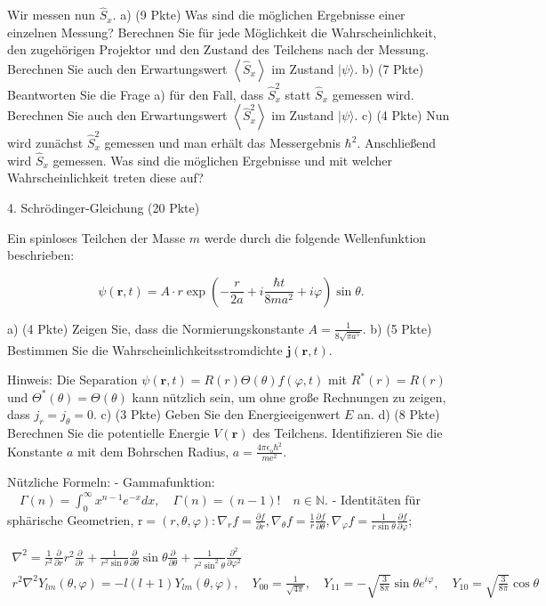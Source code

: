 \documentclass[11pt,a4paper]{article}
\begin{document}
Wir messen nun $\hat{S}_x$.
a) (9 Pkte) Was sind die möglichen Ergebnisse einer einzelnen Messung? Berechnen Sie für jede Möglichkeit die Wahrscheinlichkeit, den zugehörigen Projektor und den Zustand des Teilchens nach der Messung. Berechnen Sie auch den Erwartungswert $\left\langle\hat{S}_x\right\rangle$ im Zustand $|\psi\rangle$.
b) (7 Pkte) Beantworten Sie die Frage a) für den Fall, dass $\hat{S}_x^2$ statt $\hat{S}_x$ gemessen wird. Berechnen Sie auch den Erwartungswert $\left\langle\hat{S}_x^2\right\rangle$ im Zustand $|\psi\rangle$.
c) (4 Pkte) Nun wird zunächst $\hat{S}_x^2$ gemessen und man erhält das Messergebnis $\hbar^2$. Anschließend wird $\hat{S}_x$ gemessen. Was sind die möglichen Ergebnisse und mit welcher Wahrscheinlichkeit treten diese auf?



4. Schrödinger-Gleichung (20 Pkte)

Ein spinloses Teilchen der Masse $m$ werde durch die folgende Wellenfunktion beschrieben:

$$
\psi(\mathbf{r}, t)=A \cdot r \exp \left(-\frac{r}{2 a}+i \frac{\hbar t}{8 m a^2}+i \varphi\right) \sin \theta .
$$

a) (4 Pkte) Zeigen Sie, dass die Normierungskonstante $A=\frac{1}{8 \sqrt{\pi a^5}}$.
b) (5 Pkte) Bestimmen Sie die Wahrscheinlichkeitsstromdichte $\mathbf{j}(\mathbf{r}, t)$.

Hinweis: Die Separation $\psi(\mathbf{r}, t)=R(r) \Theta(\theta) f(\varphi, t)$ mit $R^*(r)=R(r)$ und $\Theta^*(\theta)=\Theta(\theta)$ kann nützlich sein, um ohne große Rechnungen zu zeigen, dass $j_r=j_\theta=0$.
c) (3 Pkte) Geben Sie den Energieeigenwert $E$ an.
d) (8 Pkte) Berechnen Sie die potentielle Energie $V(\mathbf{r})$ des Teilchens. Identifizieren Sie die Konstante $a$ mit dem Bohrschen Radius, $a=\frac{4 \pi \epsilon_{\mathrm{o}} \hbar^2}{m \mathrm{e}^2}$.

Nützliche Formeln:
- Gammafunktion: $\quad \Gamma(n)=\int_0^{\infty} x^{n-1} e^{-x} d x, \quad \Gamma(n)=(n-1)!\quad n \in \mathbb{N}$.
- Identitäten für sphärische Geometrien, $\mathrm{r}=(r, \theta, \varphi): \nabla_r f=\frac{\partial f}{\partial r}, \nabla_\theta f=\frac{1}{r} \frac{\partial f}{\partial \theta}, \nabla_{\varphi} f=\frac{1}{r \sin \theta} \frac{\partial f}{\partial \varphi}$;

$$
\begin{gathered}
\nabla^2=\frac{1}{r^2} \frac{\partial}{\partial r} r^2 \frac{\partial}{\partial r}+\frac{1}{r^2 \sin \theta} \frac{\partial}{\partial \theta} \sin \theta \frac{\partial}{\partial \theta}+\frac{1}{r^2 \sin ^2 \theta} \frac{\partial^2}{\partial \varphi^2} \\
r^2 \nabla^2 Y_{l m}(\theta, \varphi)=-l(l+1) Y_{l m}(\theta, \varphi), \quad Y_{00}=\frac{1}{\sqrt{4 \pi}}, \quad Y_{11}=-\sqrt{\frac{3}{8 \pi}} \sin \theta e^{i \varphi}, \quad Y_{10}=\sqrt{\frac{3}{8 \pi}} \cos \theta
\end{gathered}
$$
\end{document}
